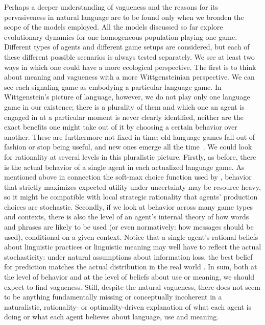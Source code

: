 \documentclass[a4paper]{article}
\newcommand{\mf}[1]{\textcolor{Red}{[mf: #1]}}
\begin{document}
Perhaps a deeper understanding of vagueness and the reasons for its pervasiveness in natural language are to be found only when we broaden the scope of the models employed.
All the models discussed so far explore evolutionary dynamics for one homogeneous population playing one game.
Different types of agents and different game setups are considered, but each of these different possible scenarios is always tested separately.
We see at least two ways in which one could have a more ecological perspective.
The first is to think about meaning and vagueness with a more Wittgensteinian perspective.
We can see each signaling game as embodying a particular language game.
In Wittgenstein's picture of language, however, we do not play only one language game in our existence; there is a plurality of them and which one an agent is engaged in at a particular moment is never clearly identified, neither are the exact benefits one might take out of it by choosing a certain behavior over another.
These are furthermore not fixed in time; old language games fall out of fashion or stop being useful, and new ones emerge all the time~\parencite[see][and in particular \S 23]{wittgenstein_philosophical_1953}.
We could look for rationality at several levels in this pluralistic picture.
Firstly, as before, there is the actual behavior of a single agent in each actualized language game.
As mentioned above in connection the soft-max choice function used by \textcite{franke_vagueness_2011}, behavior that strictly maximizes expected utility under uncertainty may be resource heavy, so it might be compatible with local strategic rationality that agents' production choices are stochastic.
Secondly, if we look at behavior across many game types and contexts, there is also the level of an agent's internal theory of how words and phrases are likely to be used (or even normatively: how messages should be used), conditional on a given context.
Notice that a single agent's rational beliefs about linguistic practices or linguistic meaning may well have to reflect the actual stochasticity: under natural assumptions about information loss, the best belief for prediction matches the actual distribution in the real world \parencite[\emph{e.g.}][]{VehtariOjanen2012:A-survey-of-Bay}.
In sum, both at the level of behavior and at the level of beliefs about use or meaning, we should expect to find vagueness.
Still, despite the natural vagueness, there does not seem to be anything fundamentally missing or conceptually incoherent in a naturalistic, rationality- or optimality-driven explanation of what each agent is doing or what each agent believes about language, use and meaning.
\end{document}
